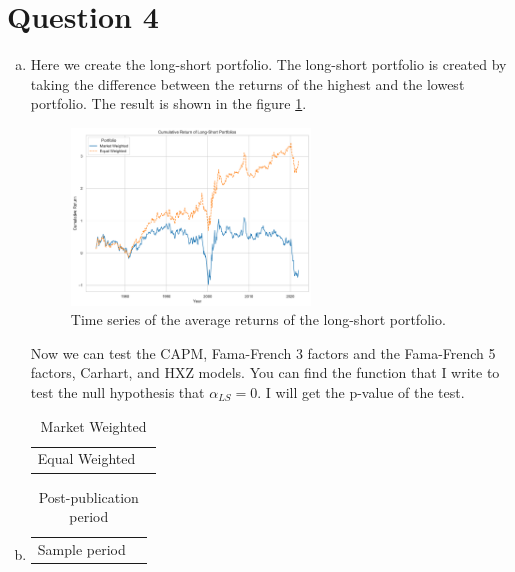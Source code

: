 \section*{Question 4}


\begin{enumerate}[(a)]

\item Here we create the long-short portfolio. The long-short portfolio is created by taking the difference between the returns of the highest and the lowest portfolio. The result is shown in the figure \ref{fig:3c}.
\begin{figure}
    \centering
    \includegraphics[width=0.6\textwidth]{Out/4_3.pdf}
    \caption{Time series of the average returns of the long-short portfolio.}
    \label{fig:3c}
\end{figure}

Now we can test the CAPM, Fama-French 3 factors and the Fama-French 5 factors, Carhart, and HXZ models. You can find the function that I write to test the null hypothesis that $\alpha_{LS} =0$. I will get the p-value of the test.   



\begin{table}[htbp]
    \caption{$\alpha$ test for long-short portfolio with different models}
    \begin{tabularx}{\linewidth}{CC}
        \caption*{Equal Weighted }
        
        &
        \caption*{Market Weighted }
        
    \end{tabularx}
\end{table}
\item 

\begin{table}[htbp]
    \caption{$\alpha$ test long-short portfolio for in and out of sample with equal weighting}
    \begin{tabularx}{\linewidth}{CC}
        \caption*{Sample period }
        
        &
        \caption*{Post-publication period}
        
    \end{tabularx}
\end{table}


\end{enumerate}
